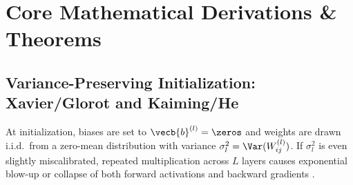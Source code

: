 \documentclass[../../../../master.tex]{subfiles}
\begin{document}
\section{Core Mathematical Derivations \& Theorems}
\label{sec:normres:derivations}

\subsection{Variance-Preserving Initialization: Xavier/Glorot and Kaiming/He}
\label{sec:normres:init}

At initialization, biases are set to $\vecb{b}^{(l)} = \zeros$ and weights are drawn i.i.d.\ from a zero-mean distribution with variance $\sigma_l^2 = \Var(W_{ij}^{(l)})$. If $\sigma_l^2$ is even slightly miscalibrated, repeated multiplication across $L$ layers causes exponential blow-up or collapse of both forward activations and backward gradients .
\end{document}
